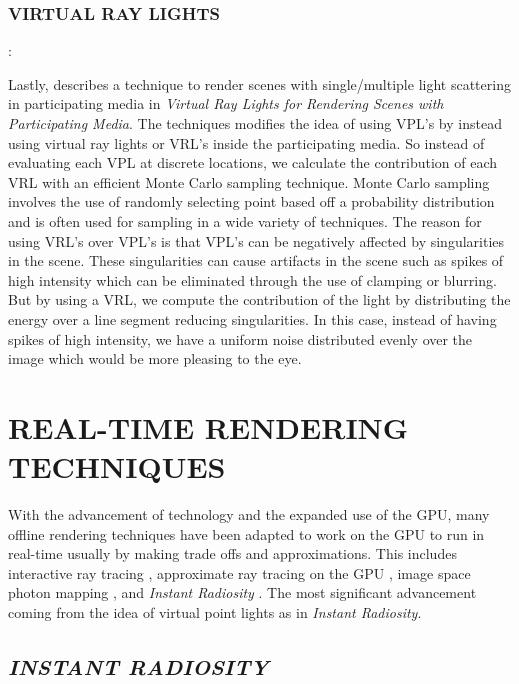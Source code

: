 \subsubsection{VIRTUAL RAY LIGHTS}: 

Lastly, \cite{Novak2012} describes a technique to render scenes with single/multiple light scattering in participating media in \textit{Virtual Ray Lights for Rendering Scenes with Participating Media}.  The techniques modifies the idea of using VPL's by instead using virtual ray lights or VRL's inside the participating media.  So instead of evaluating each VPL at discrete locations, we calculate the contribution of each VRL with an efficient Monte Carlo sampling technique.  Monte Carlo sampling involves the use of randomly selecting point based off a probability distribution and is often used for sampling in a wide variety of techniques.  The reason for using VRL's over VPL's is that VPL's can be negatively affected by singularities in the scene.  These singularities can cause artifacts in the scene such as spikes of high intensity which can be eliminated through the use of clamping or blurring.  But by using a VRL, we compute the contribution of the light by distributing the energy over a line segment reducing singularities.  In this case, instead of having spikes of high intensity, we have a uniform noise distributed evenly over the image which would be more pleasing to the eye.

\section{REAL-TIME RENDERING TECHNIQUES} \label{sec:RT}

With the advancement of technology and the expanded use of the GPU, many offline rendering techniques have been adapted to work on the GPU to run in real-time usually by making trade offs and approximations.  This includes interactive ray tracing \cite{Wald2002}, approximate ray tracing on the GPU \cite{Kalos2005}, image space photon mapping \cite{McGuire2009}, and \textit{Instant Radiosity} \cite{Keller1997}.  The most significant advancement coming from the idea of virtual point lights as in \textit{Instant Radiosity}.

\subsection{\textit{INSTANT RADIOSITY}} \label{sec:instantradiosity}

